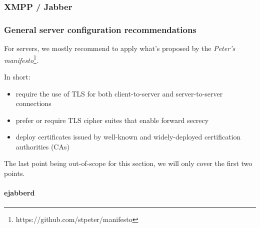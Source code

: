 \subsubsection{XMPP / Jabber}


\subsubsection{General server configuration recommendations}

For servers, we mostly recommend to apply what's proposed by the {\it Peter's manifesto}\footnote{https://github.com/stpeter/manifesto}.

In short:
\begin{itemize}
    \item require the use of TLS for both client-to-server and server-to-server connections
    \item prefer or require TLS cipher suites that enable forward secrecy
    \item deploy certificates issued by well-known and widely-deployed certification authorities (CAs)
\end{itemize}

The last point being out-of-scope for this section, we will only cover the first two points.

\paragraph{ejabberd}

